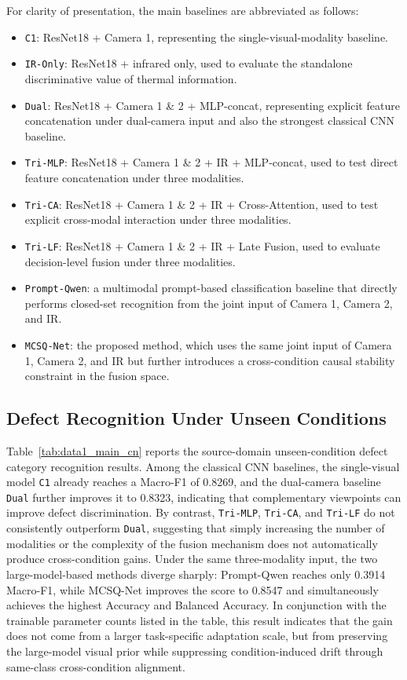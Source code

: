 \documentclass[journal]{IEEEtran}
\begin{document}
For clarity of presentation, the main baselines are abbreviated as follows:
\begin{itemize}
\item \texttt{C1}: ResNet18 + Camera 1, representing the single-visual-modality baseline.
\item \texttt{IR-Only}: ResNet18 + infrared only, used to evaluate the standalone discriminative value of thermal information.
\item \texttt{Dual}: ResNet18 + Camera 1 \& 2 + MLP-concat, representing explicit feature concatenation under dual-camera input and also the strongest classical CNN baseline.
\item \texttt{Tri-MLP}: ResNet18 + Camera 1 \& 2 + IR + MLP-concat, used to test direct feature concatenation under three modalities.
\item \texttt{Tri-CA}: ResNet18 + Camera 1 \& 2 + IR + Cross-Attention, used to test explicit cross-modal interaction under three modalities.
\item \texttt{Tri-LF}: ResNet18 + Camera 1 \& 2 + IR + Late Fusion, used to evaluate decision-level fusion under three modalities.
\item \texttt{Prompt-Qwen}: a multimodal prompt-based classification baseline that directly performs closed-set recognition from the joint input of Camera 1, Camera 2, and IR.
\item \texttt{MCSQ-Net}: the proposed method, which uses the same joint input of Camera 1, Camera 2, and IR but further introduces a cross-condition causal stability constraint in the fusion space.
\end{itemize}

\subsection{Defect Recognition Under Unseen Conditions}

Table~\ref{tab:data1_main_cn} reports the source-domain unseen-condition defect category recognition results. Among the classical CNN baselines, the single-visual model \texttt{C1} already reaches a Macro-F1 of 0.8269, and the dual-camera baseline \texttt{Dual} further improves it to 0.8323, indicating that complementary viewpoints can improve defect discrimination. By contrast, \texttt{Tri-MLP}, \texttt{Tri-CA}, and \texttt{Tri-LF} do not consistently outperform \texttt{Dual}, suggesting that simply increasing the number of modalities or the complexity of the fusion mechanism does not automatically produce cross-condition gains. Under the same three-modality input, the two large-model-based methods diverge sharply: Prompt-Qwen reaches only 0.3914 Macro-F1, while MCSQ-Net improves the score to 0.8547 and simultaneously achieves the highest Accuracy and Balanced Accuracy. In conjunction with the trainable parameter counts listed in the table, this result indicates that the gain does not come from a larger task-specific adaptation scale, but from preserving the large-model visual prior while suppressing condition-induced drift through same-class cross-condition alignment.
\end{document}
